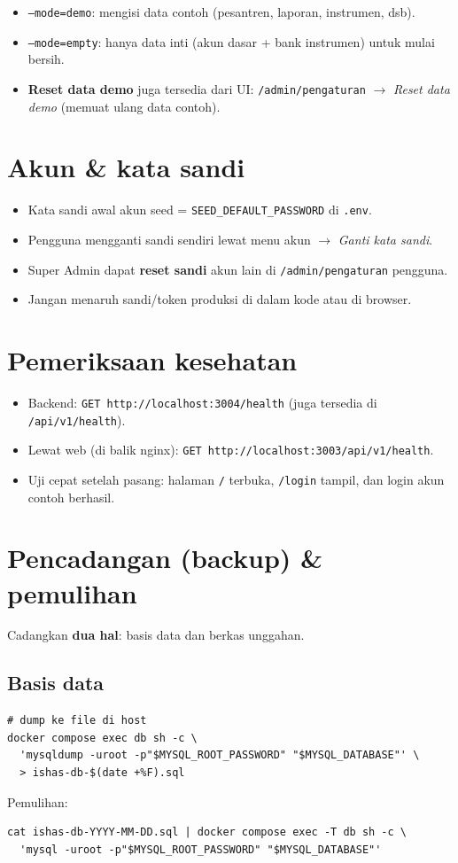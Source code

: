 \documentclass[11pt,a4paper]{article}
\newcommand{\code}[1]{\texttt{#1}}
\begin{document}
\begin{itemize}
  \item \code{--mode=demo}: mengisi data contoh (pesantren, laporan, instrumen, dsb).
  \item \code{--mode=empty}: hanya data inti (akun dasar + bank instrumen) untuk
        mulai bersih.
  \item \textbf{Reset data demo} juga tersedia dari UI: \code{/admin/pengaturan}
        $\rightarrow$ \emph{Reset data demo} (memuat ulang data contoh).
\end{itemize}

\section{Akun \& kata sandi}
\begin{itemize}
  \item Kata sandi awal akun seed = \code{SEED_DEFAULT_PASSWORD} di \code{.env}.
  \item Pengguna mengganti sandi sendiri lewat menu akun $\rightarrow$
        \emph{Ganti kata sandi}.
  \item Super Admin dapat \textbf{reset sandi} akun lain di
        \code{/admin/pengaturan} pengguna.
  \item Jangan menaruh sandi/token produksi di dalam kode atau di browser.
\end{itemize}

\section{Pemeriksaan kesehatan}
\begin{itemize}
  \item Backend: \code{GET http://localhost:3004/health} (juga tersedia di
        \code{/api/v1/health}).
  \item Lewat web (di balik nginx): \code{GET http://localhost:3003/api/v1/health}.
  \item Uji cepat setelah pasang: halaman \code{/} terbuka, \code{/login} tampil,
        dan login akun contoh berhasil.
\end{itemize}

\section{Pencadangan (backup) \& pemulihan}

Cadangkan \textbf{dua hal}: basis data dan berkas unggahan.

\subsection{Basis data}
\begin{lstlisting}
# dump ke file di host
docker compose exec db sh -c \
  'mysqldump -uroot -p"$MYSQL_ROOT_PASSWORD" "$MYSQL_DATABASE"' \
  > ishas-db-$(date +%F).sql
\end{lstlisting}
Pemulihan:
\begin{lstlisting}
cat ishas-db-YYYY-MM-DD.sql | docker compose exec -T db sh -c \
  'mysql -uroot -p"$MYSQL_ROOT_PASSWORD" "$MYSQL_DATABASE"'
\end{lstlisting}
\end{document}
